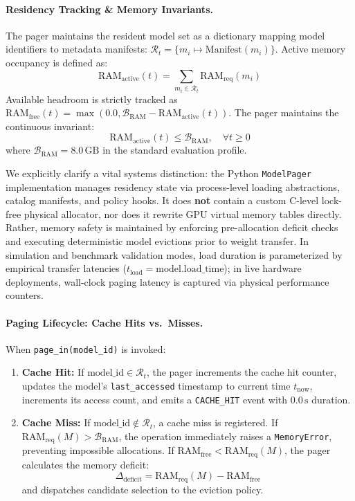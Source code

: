 \paragraph{Residency Tracking \& Memory Invariants.}
The pager maintains the resident model set as a dictionary mapping model identifiers to metadata manifests: $\mathcal{R}_t = \{m_i \mapsto \text{Manifest}(m_i)\}$. Active memory occupancy is defined as:
\begin{equation}
\text{RAM}_{\text{active}}(t) = \sum_{m_i \in \mathcal{R}_t} \text{RAM}_{\text{req}}(m_i)
\end{equation}
Available headroom is strictly tracked as $\text{RAM}_{\text{free}}(t) = \max(0.0, \mathcal{B}_{\text{RAM}} - \text{RAM}_{\text{active}}(t))$. The pager maintains the continuous invariant:
\begin{equation}
\text{RAM}_{\text{active}}(t) \le \mathcal{B}_{\text{RAM}}, \quad \forall t \ge 0
\end{equation}
where $\mathcal{B}_{\text{RAM}} = 8.0\,\text{GB}$ in the standard evaluation profile.

We explicitly clarify a vital systems distinction: the Python \texttt{ModelPager} implementation manages residency state via process-level loading abstractions, catalog manifests, and policy hooks. It does \textbf{not} contain a custom C-level lock-free physical allocator, nor does it rewrite GPU virtual memory tables directly. Rather, memory safety is maintained by enforcing pre-allocation deficit checks and executing deterministic model evictions prior to weight transfer. In simulation and benchmark validation modes, load duration is parameterized by empirical transfer latencies ($t_{\text{load}} = \text{model.load\_time}$); in live hardware deployments, wall-clock paging latency is captured via physical performance counters.

\paragraph{Paging Lifecycle: Cache Hits vs.\ Misses.}
When \texttt{page\_in(model\_id)} is invoked:
\begin{enumerate}
    \item \textbf{Cache Hit:} If $\text{model\_id} \in \mathcal{R}_t$, the pager increments the cache hit counter, updates the model's \texttt{last\_accessed} timestamp to current time $t_{\text{now}}$, increments its access count, and emits a \texttt{CACHE\_HIT} event with $0.0\,\text{s}$ duration.
    \item \textbf{Cache Miss:} If $\text{model\_id} \notin \mathcal{R}_t$, a cache miss is registered. If $\text{RAM}_{\text{req}}(M) > \mathcal{B}_{\text{RAM}}$, the operation immediately raises a \texttt{MemoryError}, preventing impossible allocations. If $\text{RAM}_{\text{free}} < \text{RAM}_{\text{req}}(M)$, the pager calculates the memory deficit:
    \begin{equation}
    \Delta_{\text{deficit}} = \text{RAM}_{\text{req}}(M) - \text{RAM}_{\text{free}}
    \end{equation}
    and dispatches candidate selection to the eviction policy.
\end{enumerate}

